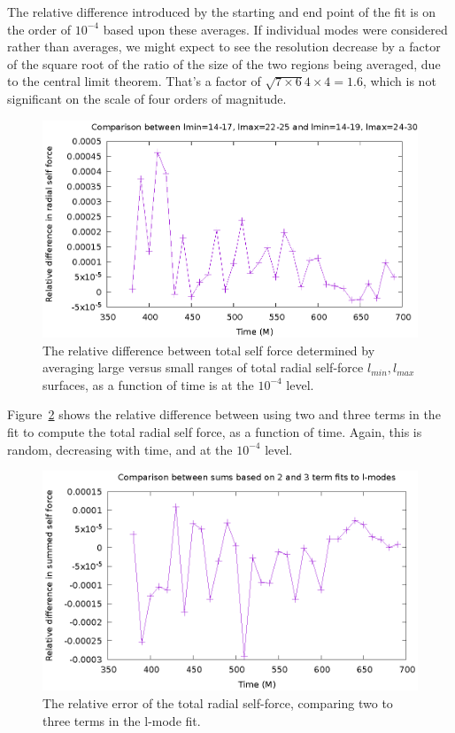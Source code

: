 The relative difference introduced by the starting and end point of the fit is on the order of $10^{-4}$ based upon these averages. If individual modes were considered rather than averages, we might expect to see the resolution decrease by a factor of the square root of the ratio of the size of the two regions being averaged, due to the central limit theorem. That's a factor of $\sqrt{7\times 6}{4\times 4}=1.6$, which is not significant on the scale of four orders of magnitude. 


\begin{figure}
  \includegraphics{relErrBigSmallRangeOverTime.eps}
  \caption{The relative difference between total self force determined by averaging large versus small ranges of total radial self-force $l_{min},l_{max}$ surfaces, as a function of time is at the $10^{-4}$ level.}
  \label{relErrSelfForceBigSmall}
\end{figure}


Figure~\ref{relErr23terms} shows the relative difference between using two and three terms in the fit to compute the total radial self force, as a function of time. Again, this is random, decreasing with time, and at the $10^{-4}$ level. 


\begin{figure}
  \includegraphics{relativeError23termSelfForce.eps}
  \caption{The relative error of the total radial self-force, comparing two to three terms in the l-mode fit.}
  \label{relErr23terms}
\end{figure}


